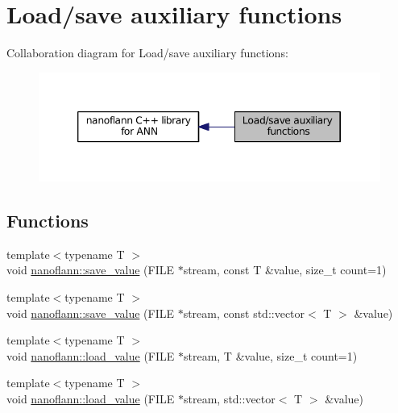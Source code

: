 \hypertarget{group__loadsave__grp}{\section{Load/save auxiliary functions}
\label{group__loadsave__grp}
}
Collaboration diagram for Load/save auxiliary functions\-:\nopagebreak
\begin{figure}[H]
\begin{center}
\leavevmode
\includegraphics[width=346pt]{group__loadsave__grp}
\end{center}
\end{figure}
\subsection*{Functions}
\begin{DoxyCompactItemize}
\item 
{\footnotesize template$<$typename T $>$ }\\void \hyperlink{group__loadsave__grp_gadf909159ea32f125f71328d00ac2de8d}{nanoflann\-::save\-\_\-value} (F\-I\-L\-E $\ast$stream, const T \&value, size\-\_\-t count=1)
\item 
{\footnotesize template$<$typename T $>$ }\\void \hyperlink{group__loadsave__grp_gac767ee9c25febe0cd6af3ac2e186ffe7}{nanoflann\-::save\-\_\-value} (F\-I\-L\-E $\ast$stream, const std\-::vector$<$ T $>$ \&value)
\item 
{\footnotesize template$<$typename T $>$ }\\void \hyperlink{group__loadsave__grp_ga81940cd63b9ae619251d612d0ddbc819}{nanoflann\-::load\-\_\-value} (F\-I\-L\-E $\ast$stream, T \&value, size\-\_\-t count=1)
\item 
{\footnotesize template$<$typename T $>$ }\\void \hyperlink{group__loadsave__grp_gaefed46e8576d6ce3f1796bb13387ad3d}{nanoflann\-::load\-\_\-value} (F\-I\-L\-E $\ast$stream, std\-::vector$<$ T $>$ \&value)
\end{DoxyCompactItemize}


